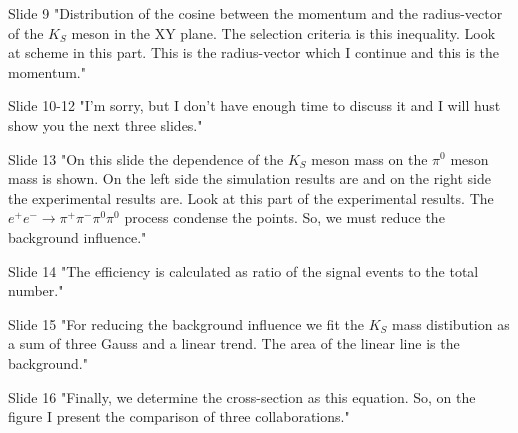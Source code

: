 Slide 9
    "Distribution of the cosine between the momentum and the radius-vector of the $K_{S}$ meson in the XY plane. The selection criteria is this inequality. Look at scheme in this part. This is the radius-vector which I continue and this is the momentum."
    
Slide 10-12
    "I'm sorry, but I don't have enough time to discuss it and I will hust show you the next three slides."
    
Slide 13
    "On this slide the dependence of the $K_{S}$ meson mass on the $\pi^{0}$ meson mass is shown. On the left side the simulation results are and on the right side the experimental results are. Look at this part of the experimental results. The $e^{+} e^{-} \to \pi^{+} \pi^{-} \pi^{0} \pi^{0}$ process condense the points. So, we must reduce the background influence."
    
Slide 14
    "The efficiency is calculated as ratio of the signal events to the total number."
    
Slide 15
    "For reducing the background influence we fit the $K_{S}$ mass distibution as a sum of three Gauss and a linear trend. The area of the linear line is the background."
    
Slide 16
    "Finally, we determine the cross-section as this equation. So, on the figure I present the comparison of three collaborations."
    
    